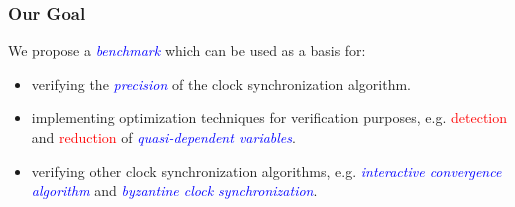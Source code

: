 \documentclass[serif]{beamer}
\begin{document}
\begin{frame}\frametitle{\textbf{Our Goal}}
We propose a \emph{\textcolor{blue}{benchmark}} which can be used as a basis for: 
\begin{itemize}
	\item verifying the \emph{\textcolor{blue}{precision}} of the clock synchronization algorithm. 
	\item implementing optimization techniques for verification purposes, e.g. 
				\textcolor{red}{detection} and \textcolor{red}{reduction} of \emph{\textcolor{blue}{quasi-dependent variables}}.
	\item verifying other clock synchronization algorithms, e.g. \emph{\textcolor{blue}{interactive convergence algorithm}}	and 
				\emph{\textcolor{blue}{byzantine clock synchronization}}.
\end{itemize}
\end{frame}
\end{document}
